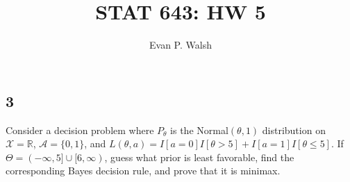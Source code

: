 \documentclass[12pt]{article}
\title{STAT 643: HW 5}
\author{Evan P. Walsh}
\begin{document}
\maketitle


\newpage
\subsection*{3}
\begin{tcolorbox}
  Consider a decision problem where $P_\theta$ is the Normal$(\theta,1)$ distribution on $\mathcal{X}=\mathbb{R}$, $\mathcal{A}=\{0,1\}$, and $L(\theta,a)=I[a=0]I[\theta>5] + I[a=1]I[\theta \leq 5]$.  If $\Theta= (-\infty,5] \cup [6,\infty)$, guess what prior is least favorable, find the corresponding Bayes decision rule, and prove that it is minimax.
\end{tcolorbox}
\end{document}
